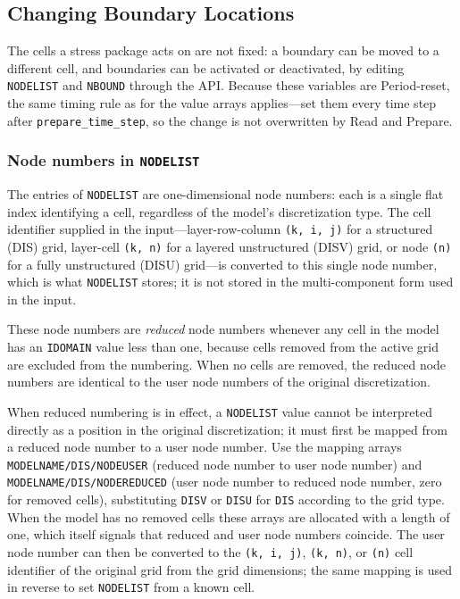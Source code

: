 \subsection{Changing Boundary Locations}

The cells a stress package acts on are not fixed: a boundary can be moved to a
different cell, and boundaries can be activated or deactivated, by editing
\texttt{NODELIST} and \texttt{NBOUND} through the API. Because these variables
are Period-reset, the same timing rule as for the value arrays applies---set them
every time step after \texttt{prepare\_time\_step}, so the change is not
overwritten by Read and Prepare.

\subsubsection{Node numbers in \texttt{NODELIST}}

The entries of \texttt{NODELIST} are one-dimensional node numbers: each is a
single flat index identifying a cell, regardless of the model's discretization
type. The cell identifier supplied in the input---layer-row-column
\texttt{(k, i, j)} for a structured (DIS) grid, layer-cell \texttt{(k, n)} for a
layered unstructured (DISV) grid, or node \texttt{(n)} for a fully unstructured
(DISU) grid---is converted to this single node number, which is what
\texttt{NODELIST} stores; it is not stored in the multi-component form used in the
input.

These node numbers are \emph{reduced} node numbers whenever any cell in the model
has an \texttt{IDOMAIN} value less than one, because cells removed from the active
grid are excluded from the numbering. When no cells are removed, the reduced node
numbers are identical to the user node numbers of the original discretization.

When reduced numbering is in effect, a \texttt{NODELIST} value cannot be
interpreted directly as a position in the original discretization; it must first
be mapped from a reduced node number to a user node number. Use the mapping arrays
\texttt{MODELNAME/DIS/NODEUSER} (reduced node number to user node number) and
\texttt{MODELNAME/DIS/NODEREDUCED} (user node number to reduced node number, zero
for removed cells), substituting \texttt{DISV} or \texttt{DISU} for \texttt{DIS}
according to the grid type. When the model has no removed cells these arrays are
allocated with a length of one, which itself signals that reduced and user node
numbers coincide. The user node number can then be converted to the
\texttt{(k, i, j)}, \texttt{(k, n)}, or \texttt{(n)} cell identifier of the
original grid from the grid dimensions; the same mapping is used in reverse to set
\texttt{NODELIST} from a known cell.

